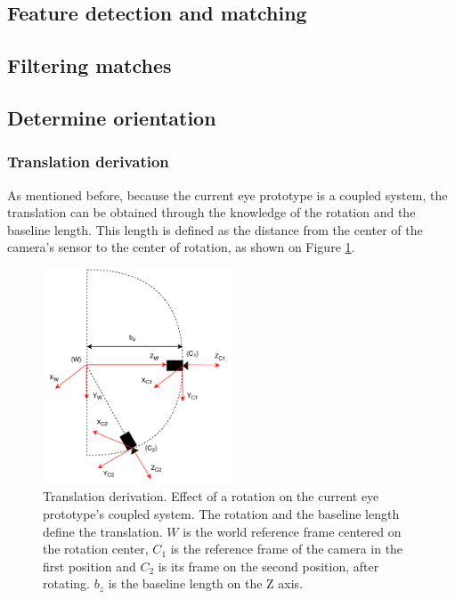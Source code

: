\subsection{Feature detection and matching}

\subsection{Filtering matches}

\subsection{Determine orientation}

\subsubsection{Translation derivation}

As mentioned before, because the current eye prototype is a coupled system, the translation can be obtained through the knowledge of the rotation and the baseline length. This length is defined as the distance from the center of the camera's sensor to the center of rotation, as shown on Figure
\ref{cha3:detori:translation}.

\begin{figure}[ht]
	\centering
	\includegraphics[width=0.5\textwidth]{images/transf.pdf}
	\caption[Translation derivation]{Translation derivation. Effect of a rotation on the current eye prototype's coupled system. The rotation and the baseline length define the translation. ${W}$ is the world reference frame centered on the rotation center, ${C_1}$ is the reference frame of the camera in the first position and ${C_2}$ is its frame on the second position, after rotating. $b_z$ is the baseline length on the Z axis.}
	\label{cha3:detori:translation}
\end{figure}

